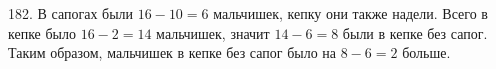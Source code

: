182. В сапогах были $16-10=6$ мальчишек, кепку они также надели. Всего в кепке было $16-2=14$ мальчишек, значит $14-6=8$ были в кепке без сапог. Таким образом, мальчишек в кепке без сапог было на $8-6=2$ больше.\\
